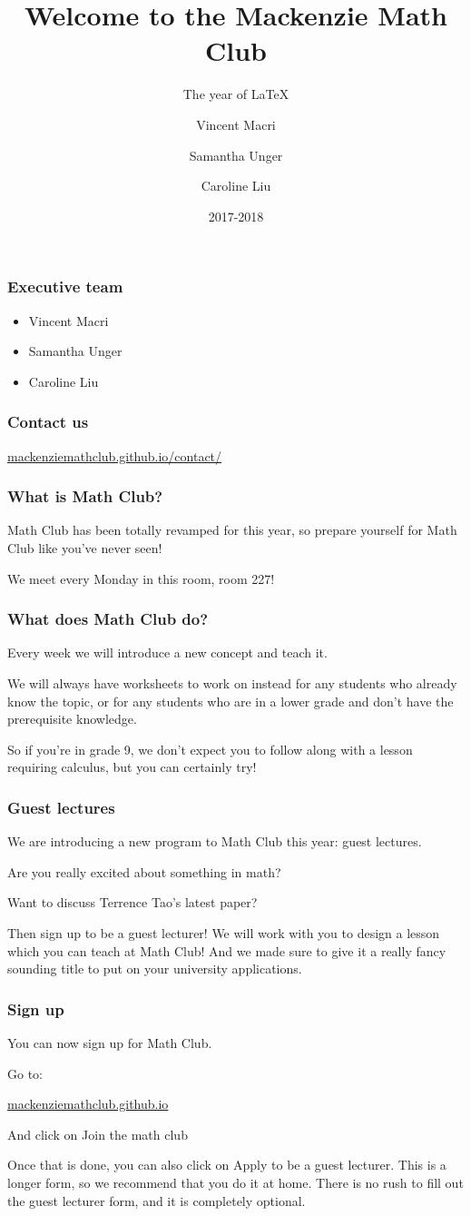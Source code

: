 \documentclass[mathserif]{beamer}
\title{Welcome to the Mackenzie Math Club}
\subtitle{The year of \textrm{\LaTeX{}}}
\author{Vincent Macri \and Samantha Unger \and Caroline Liu}
\date{2017-2018}
\begin{document}
	\frame{\titlepage}
	\begin{frame}
		\frametitle{Executive team}
		\pause
		\begin{itemize}[<+->]
			\item Vincent Macri
			\item Samantha Unger
			\item Caroline Liu
		\end{itemize}
	\end{frame}
	\begin{frame}
		\frametitle{Contact us}
		\begin{center}
			\Large
			\url{mackenziemathclub.github.io/contact/}
		\end{center}
	\end{frame}
	\begin{frame}
		\frametitle{What is Math Club?}
		Math Club has been totally revamped for this year, so prepare yourself for Math Club like you've never seen!

		We meet every Monday in \alert{this} room, room 227!
	\end{frame}
	\begin{frame}
		\frametitle{What does Math Club do?}
		Every week we will introduce a new concept and teach it.
		\pause
		
		We will always have worksheets to work on instead for any students who already know the topic, or for any students who are in a lower grade and don't have the prerequisite knowledge.
		\pause

		So if you're in grade 9, we don't expect you to follow along with a lesson requiring calculus, but you can certainly try!
	\end{frame}
	\begin{frame}
		\frametitle{Guest lectures}
		We are introducing a new program to Math Club this year: guest lectures.
		\pause

		Are you really excited about something in math?
		\pause

		Want to discuss Terrence Tao's latest paper?
		\pause

		Then sign up to be a guest lecturer! We will work with you to design a lesson which you can teach at Math Club! And we made sure to give it a really fancy sounding title to put on your university applications.
	\end{frame}
	\begin{frame}
		\frametitle{Sign up}
		You can now sign up for Math Club.

		Go to:
		\begin{center}
			\huge
			\url{mackenziemathclub.github.io}
		\end{center}
		And click on \alert{Join the math club}
		\pause

		Once that is done, you can also click on \alert{Apply to be a guest lecturer}. This is a longer form, so we recommend that you do it at home. There is no rush to fill out the guest lecturer form, and it is completely optional.
	\end{frame}
\end{document}

